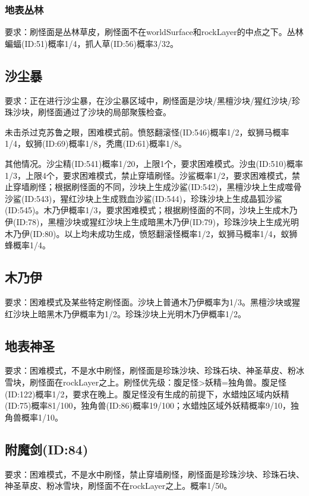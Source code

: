 \subsubsection{地表丛林}
要求：刷怪面是丛林草皮，刷怪面不在worldSurface和rockLayer的中点之下。丛林蝙蝠(ID:51)概率1/4，抓人草(ID:56)概率3/32。

\subsection{沙尘暴}
要求：正在进行沙尘暴，在沙尘暴区域中，刷怪面是沙块/黑檀沙块/猩红沙块/珍珠沙块，刷怪面通过了沙块的局部聚簇检查。

未击杀过克苏鲁之眼，困难模式前。愤怒翻滚怪(ID:546)概率1/2，蚁狮马概率1/4，蚁狮(ID:69)概率1/8，秃鹰(ID:61)概率1/8。

其他情况。沙尘精(ID:541)概率1/20，上限1个，要求困难模式。沙虫(ID:510)概率1/3，上限4个，要求困难模式，禁止穿墙刷怪。沙鲨概率1/2，要求困难模式，禁止穿墙刷怪；根据刷怪面的不同，沙块上生成沙鲨(ID:542)，黑檀沙块上生成噬骨沙鲨(ID:543)，猩红沙块上生成戮血沙鲨(ID:544)，珍珠沙块上生成晶狐沙鲨(ID:545)。木乃伊概率1/3，要求困难模式；根据刷怪面的不同，沙块上生成木乃伊(ID:78)，黑檀沙块或猩红沙块上生成暗黑木乃伊(ID:79)，珍珠沙块上生成光明木乃伊(ID:80)。以上均未成功生成，愤怒翻滚怪概率1/2，蚁狮马概率1/4，蚁狮蜂概率1/4。

\subsection{木乃伊}
要求：困难模式及某些特定刷怪面。沙块上普通木乃伊概率为1/3。黑檀沙块或猩红沙块上暗黑木乃伊概率为1/2。珍珠沙块上光明木乃伊概率1/2。

\subsection{地表神圣}
要求：困难模式，不是水中刷怪，刷怪面是珍珠沙块、珍珠石块、神圣草皮、粉冰雪块，刷怪面在rockLayer之上。刷怪优先级：腹足怪>妖精=独角兽。腹足怪(ID:122)概率1/2，要求在晚上。腹足怪没有生成的前提下，水蜡烛区域内妖精(ID:75)概率81/100，独角兽(ID:86)概率19/100；水蜡烛区域外妖精概率9/10，独角兽概率1/10。

\subsection{附魔剑(ID:84)}
要求：困难模式，不是水中刷怪，禁止穿墙刷怪，刷怪面是珍珠沙块、珍珠石块、神圣草皮、粉冰雪块，刷怪面不在rockLayer之上。概率1/50。

